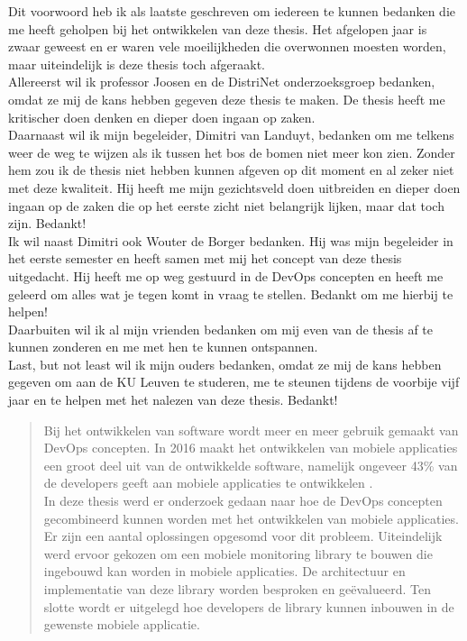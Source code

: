 \documentclass[master=cws,masteroption=se]{kulemt}
\begin{document}
\begin{preface}
Dit voorwoord heb ik als laatste geschreven om iedereen te kunnen bedanken die me heeft geholpen bij het ontwikkelen van deze thesis. Het afgelopen jaar is zwaar geweest en er waren vele moeilijkheden die overwonnen moesten worden, maar uiteindelijk is deze thesis toch afgeraakt. \\

Allereerst wil ik professor Joosen en de DistriNet onderzoeksgroep bedanken, omdat ze mij de kans hebben gegeven deze thesis te maken. De thesis heeft me kritischer doen denken en dieper doen ingaan op zaken. \\

Daarnaast wil ik mijn begeleider, Dimitri van Landuyt, bedanken om me telkens weer de weg te wijzen als ik tussen het bos de bomen niet meer kon zien. Zonder hem zou ik de thesis niet hebben kunnen afgeven op dit moment en al zeker niet met deze kwaliteit. Hij heeft me mijn gezichtsveld doen uitbreiden en dieper doen ingaan op de zaken die op het eerste zicht niet belangrijk lijken, maar dat toch zijn. Bedankt! \\

Ik wil naast Dimitri ook Wouter de Borger bedanken. Hij was mijn begeleider in het eerste semester en heeft samen met mij het concept van deze thesis uitgedacht. Hij heeft me op weg gestuurd in de DevOps concepten en heeft me geleerd om alles wat je tegen komt in vraag te stellen. Bedankt om me hierbij te helpen! \\

Daarbuiten wil ik al mijn vrienden bedanken om mij even van de thesis af te kunnen zonderen en me met hen te kunnen ontspannen. \\

Last, but not least wil ik mijn ouders bedanken, omdat ze mij de kans hebben gegeven om aan de KU Leuven te studeren, me te steunen tijdens de voorbije vijf jaar en te helpen met het nalezen van deze thesis. Bedankt!

  
  
\end{preface}

\tableofcontents*

\begin{abstract}
Bij het ontwikkelen van software wordt meer en meer gebruik gemaakt van DevOps concepten. In 2016 maakt het ontwikkelen van mobiele applicaties een groot deel uit van de ontwikkelde software, namelijk ongeveer 43\% van de developers geeft aan mobiele applicaties te ontwikkelen \cite{MobApp}. \\
In deze thesis werd er onderzoek gedaan naar hoe de DevOps concepten gecombineerd kunnen worden met het ontwikkelen van mobiele applicaties. Er zijn een aantal oplossingen opgesomd voor dit probleem. Uiteindelijk werd ervoor gekozen om een mobiele monitoring library te bouwen die ingebouwd kan worden in mobiele applicaties. De architectuur en implementatie van deze library worden besproken en ge\"evalueerd. Ten slotte wordt er uitgelegd hoe developers de library kunnen inbouwen in de gewenste mobiele applicatie. 
\end{abstract}
\end{document}
